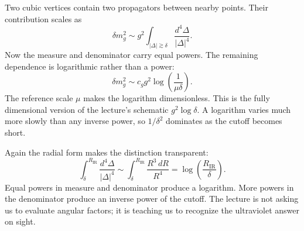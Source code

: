 Two cubic vertices contain two propagators between nearby points. Their
contribution scales as
\begin{equation}
\delta m_g^2
\sim
g^2\int_{|\Delta|\gtrsim\delta}
\frac{d^4\Delta}{|\Delta|^4}.
\label{eq:cubic-loop}
\end{equation}
Now the measure and denominator carry equal powers. The remaining dependence
is logarithmic rather than a power:
\begin{equation}
\delta m_g^2
\sim
c_g g^2\log\!\left(\frac{1}{\mu\delta}\right).
\label{eq:cubic-log}
\end{equation}
The reference scale \(\mu\) makes the logarithm dimensionless. This is the
fully dimensional version of the lecture's schematic \(g^2\log\delta\). A
logarithm varies much more slowly than any inverse power, so
\(1/\delta^2\) dominates as the cutoff becomes short.

Again the radial form makes the distinction transparent:
\begin{equation}
\int_{\delta}^{R_{\mathrm{IR}}}
\frac{d^4\Delta}{|\Delta|^4}
\sim
\int_{\delta}^{R_{\mathrm{IR}}}\frac{R^3\,dR}{R^4}
=\log\!\left(\frac{R_{\mathrm{IR}}}{\delta}\right).
\end{equation}
Equal powers in measure and denominator produce a logarithm. More powers in
the denominator produce an inverse power of the cutoff. The lecture is not
asking us to evaluate angular factors; it is teaching us to recognize the
ultraviolet answer on sight.

\begin{classroomqa}
\end{classroomqa}

\begin{classroomqa}
\end{classroomqa}

